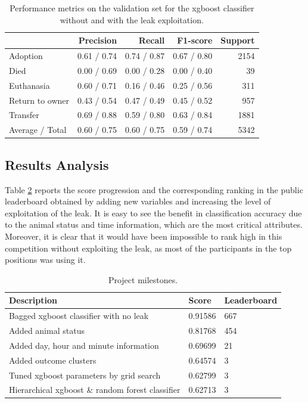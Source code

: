 \documentclass[a4paper,11pt]{article}
\begin{document}
\begin{table}[t]
\centering
\begin{tabular}{@{}lrrrr@{}}
\toprule
                & Precision   & Recall      & F1-score    & Support \\ \midrule
Adoption        & 0.61 / 0.74 & 0.74 / 0.87 & 0.67 / 0.80 & 2154    \\
Died            & 0.00 / 0.69 & 0.00 / 0.28 & 0.00 / 0.40 & 39      \\
Euthanasia      & 0.60 / 0.71 & 0.16 / 0.46 & 0.25 / 0.56 & 311     \\
Return to owner & 0.43 / 0.54 & 0.47 / 0.49 & 0.45 / 0.52 & 957     \\
Transfer        & 0.69 / 0.88 & 0.59 / 0.80 & 0.63 / 0.84 & 1881    \\ \midrule
Average / Total & 0.60 / 0.75 & 0.60 / 0.75 & 0.59 / 0.74 & 5342    \\ \bottomrule
\end{tabular}
\caption{Performance metrics on the validation set for the xgboost classifier without and with the leak exploitation.}
\label{tab:xgboost_performance_leak}
\end{table}

\subsection{Results Analysis}
Table \ref{tab:milestones} reports the score progression and the corresponding ranking in the public leaderboard obtained by adding new variables and increasing the level of exploitation of the leak. It is easy to see the benefit in classification accuracy due to the animal status and time information, which are the most critical attributes. Moreover, it is clear that it would have been impossible to rank high in this competition without exploiting the leak, as most of the participants in the top positions was using it. 


\begin{table}[t]
\centering
\begin{tabular}{@{}lll@{}}
\toprule
Description                                      & Score   & Leaderboard \\ \midrule
Bagged xgboost classifier with no leak           & 0.91586 & 667         \\
Added animal status                              & 0.81768 & 454         \\
Added day, hour and minute information           & 0.69699 & 21          \\
Added outcome clusters                           & 0.64574 & 3           \\
Tuned xgboost parameters by grid search          & 0.62799 & 3           \\
Hierarchical xgboost \& random forest classifier & 0.62713 & 3           \\ \bottomrule
\end{tabular}
\caption{Project milestones.}
\label{tab:milestones}
\end{table}
\end{document}
